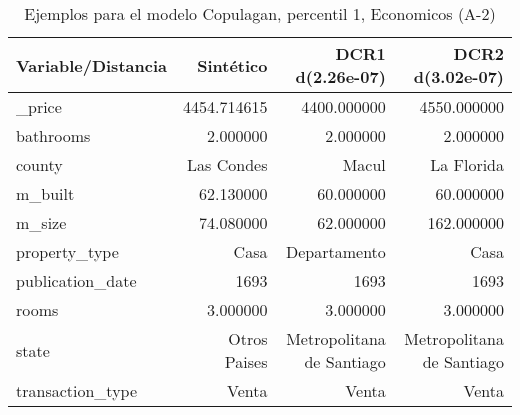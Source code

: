 \begin{table}[H]
\centering
\fontsize{10}{14}\selectfont
\caption{Ejemplos para el modelo Copulagan, percentil 1, Economicos (A-2)}
\label{table-example-economicos-a-2-copulagan-1p}
\begin{tabular}{|l|r|r|r|}
\hline
\rowcolor[gray]{0.8}
Variable/Distancia & Sintético & DCR1 d(2.26e-07) & DCR2 d(3.02e-07) \\
\hline \_price & \cellcolor[rgb]{0.9, 0.54, 0.52} 4454.714615 & 4400.000000 & 4550.000000 \\
\hline bathrooms & \cellcolor[rgb]{0.9, 0.54, 0.52} 2.000000 & \cellcolor[rgb]{0.9, 0.54, 0.52} 2.000000 & \cellcolor[rgb]{0.9, 0.54, 0.52} 2.000000 \\
\hline county & \cellcolor[rgb]{0.9, 0.54, 0.52} Las Condes & Macul & La Florida \\
\hline m\_built & \cellcolor[rgb]{0.9, 0.54, 0.52} 62.130000 & 60.000000 & 60.000000 \\
\hline m\_size & \cellcolor[rgb]{0.9, 0.54, 0.52} 74.080000 & 62.000000 & 162.000000 \\
\hline property\_type & \cellcolor[rgb]{0.9, 0.54, 0.52} Casa & Departamento & \cellcolor[rgb]{0.9, 0.54, 0.52} Casa \\
\hline publication\_date & \cellcolor[rgb]{0.9, 0.54, 0.52} 1693 & \cellcolor[rgb]{0.9, 0.54, 0.52} 1693 & \cellcolor[rgb]{0.9, 0.54, 0.52} 1693 \\
\hline rooms & \cellcolor[rgb]{0.9, 0.54, 0.52} 3.000000 & \cellcolor[rgb]{0.9, 0.54, 0.52} 3.000000 & \cellcolor[rgb]{0.9, 0.54, 0.52} 3.000000 \\
\hline state & \cellcolor[rgb]{0.9, 0.54, 0.52} Otros Paises & Metropolitana de Santiago & Metropolitana de Santiago \\
\hline transaction\_type & \cellcolor[rgb]{0.9, 0.54, 0.52} Venta & \cellcolor[rgb]{0.9, 0.54, 0.52} Venta & \cellcolor[rgb]{0.9, 0.54, 0.52} Venta \\
\hline
\end{tabular}
\end{table}
